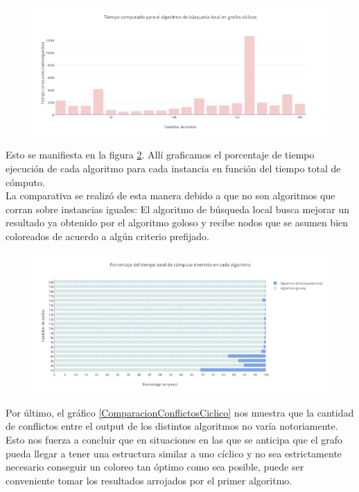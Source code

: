  \begin{figure}[H]
    \centering
  	\includegraphics[width=18cm]{imagenes/Ej5/TiempoLocalCiclico.png}
    \caption{}
 	  \label{TiempoLocalCiclico}
  \end{figure}

Esto se manifiesta en la figura \ref{ComparacionTiemposCiclico}. Allí graficamos el porcentaje de tiempo ejecución de cada algoritmo para cada instancia en función del tiempo total de cómputo.\\
La comparativa se realizó de esta manera debido a que no son algoritmos que corran sobre instancias iguales: El algoritmo de búsqueda local busca mejorar un resultado ya obtenido por el algoritmo goloso y recibe nodos que se asumen bien coloreados de acuerdo a algún criterio prefijado.

 \begin{figure}[H]
    \centering
  	\includegraphics[width=18cm]{imagenes/Ej5/ComparacionTiemposCiclico.png}
    \caption{}
 	  \label{ComparacionTiemposCiclico}
  \end{figure}

Por último, el gráfico \ref{ComparacionConflictosCiclico} nos muestra que la cantidad de conflictos entre el output de los distintos algoritmos no varía notoriamente. Esto nos fuerza a concluir que en situaciones en las que se anticipa que el grafo pueda llegar a tener una estructura similar a uno cíclico y no sea estrictamente necesario conseguir un coloreo tan óptimo como sea posible, puede ser conveniente tomar los resultados arrojados por el primer algoritmo.

